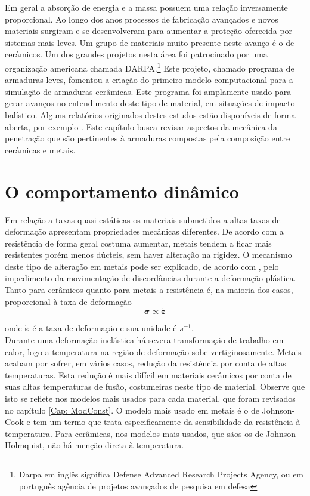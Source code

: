  Em geral a absorção de energia e a massa possuem uma relação inversamente proporcional. Ao longo dos anos processos de fabricação avançados e novos materiais surgiram e se desenvolveram para aumentar a proteção oferecida por sistemas mais leves. Um grupo de materiais muito presente neste avanço é o de cerâmicos. Um dos grandes projetos nesta área foi patrocinado por uma organização americana chamada DARPA.\footnote{Darpa em inglês significa Defense Advanced Research Projects Agency, ou em português agência de projetos avançados de pesquisa em defesa} Este projeto, chamado programa de armaduras leves, fomentou a criação do primeiro modelo computacional para a simulação de armaduras cerâmicas. Este programa foi amplamente usado para gerar avanços no entendimento deste tipo de material, em situações de impacto balístico. Alguns relatórios originados destes estudos estão disponíveis de forma aberta, por exemplo \cite{firstreport}. Este capítulo busca revisar aspectos da mecânica da penetração que são pertinentes à armaduras compostas pela composição entre cerâmicas e metais. \\
 
  \section{O comportamento dinâmico}
 
 Em relação a taxas quasi-estáticas os materiais submetidos a altas taxas de deformação apresentam propriedades mecânicas diferentes. De acordo com \cite{Hazell} a resistência de forma geral costuma aumentar, metais tendem a ficar mais resistentes porém menos dúcteis, sem haver alteração na rigidez. O mecanismo deste tipo de alteração em metais pode ser explicado, de acordo com \cite{Hazell}, pelo impedimento da movimentação de discordâncias durante a deformação plástica.\\ 
 
 Tanto para cerâmicos quanto para metais a resistência é, na maioria dos casos, proporcional à taxa de deformação
 \begin{equation}
 	\boldsymbol{\sigma} \propto \dot{\boldsymbol{\varepsilon}}
 \end{equation}
 
onde $ \dot{\boldsymbol{\varepsilon}} $ é a taxa de deformação e sua unidade é $ s^{-1} $.\\
Durante uma deformação inelástica há severa transformação de trabalho em calor, logo a temperatura na região de deformação sobe vertiginosamente. Metais acabam por sofrer, em vários casos, redução da resistência por conta de altas temperaturas. Esta redução é mais difícil em materiais cerâmicos por conta de suas altas temperaturas de fusão, costumeiras neste tipo de material. Observe que isto se reflete nos modelos mais usados para cada material, que foram revisados no capítulo  \ref{Cap: ModConst}. O modelo mais usado em metais é o de Johnson-Cook e tem um termo que trata especificamente da sensibilidade da resistência à temperatura. Para cerâmicas, nos modelos mais usados, que sãos os de Johnson-Holmquist, não há menção direta à temperatura. \\ 

